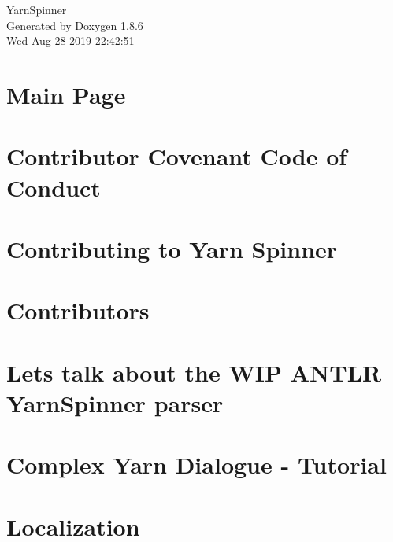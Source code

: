 \documentclass[twoside]{book}
\newcommand{\clearemptydoublepage}{%
  \newpage{\pagestyle{empty}\cleardoublepage}%
}
\begin{document}
\hypersetup{pageanchor=false}
\begin{titlepage}
\vspace*{7cm}
\begin{center}%
{\Large Yarn\-Spinner }\\
\vspace*{1cm}
{\large Generated by Doxygen 1.8.6}\\
\vspace*{0.5cm}
{\small Wed Aug 28 2019 22:42:51}\\
\end{center}
\end{titlepage}
\clearemptydoublepage
\tableofcontents
\clearemptydoublepage
{}
\hypersetup{pageanchor=true}

\chapter{Main Page}
\label{index}\hypertarget{index}{}
\chapter{Contributor Covenant Code of Conduct}
\label{a00002}
\hypertarget{a00002}{}

\chapter{Contributing to Yarn Spinner}
\label{a00004}
\hypertarget{a00004}{}

\chapter{Contributors}
\label{a00006}
\hypertarget{a00006}{}

\chapter{Lets talk about the W\-I\-P A\-N\-T\-L\-R Yarn\-Spinner parser}
\label{a00008}
\hypertarget{a00008}{}

\chapter{Complex Yarn Dialogue -\/ Tutorial}
\label{a00010}
\hypertarget{a00010}{}

\chapter{Localization}
\label{a00012}
\hypertarget{a00012}{}

\end{document}
